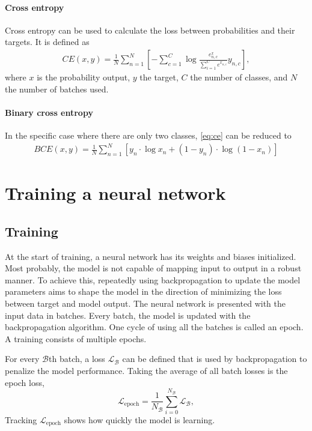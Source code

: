 \paragraph{Cross entropy}
Cross entropy can be used to calculate the loss between probabilities and their targets.
It is defined as
\begin{align}\label{eq:ce}
    CE(x, y) = \frac{1}{N}\sum_{n=1}^N \left[-\sum_{c=1}^C \log \frac{e^x_{n,c}}{\sum_{i=1}^C e^{x_{n,i}}} y_{n,c}\right],
\end{align}
where $x$ is the probability output, $y$ the target, $C$ the number of classes, and $N$ the number of batches used.

\paragraph{Binary cross entropy}
In the specific case where there are only two classes, \cref{eq:ce} can be reduced to
\begin{align}
    BCE(x, y) = \frac{1}{N}\sum_{n=1}^N [y_n \cdot \log x_n + (1 - y_n) \cdot \log (1-x_n)]
\end{align}


\section{Training a neural network}

\subsection{Training}\label{Training}
At the start of training, a neural network has its weights and biases initialized.
Most probably, the model is not capable of mapping input to output in a robust manner.
To achieve this, repeatedly using backpropagation to update the model parameters aims to shape the model in the direction of minimizing the loss between target and model output.
The neural network is presented with the input data in batches.
Every batch, the model is updated with the backpropagation algorithm.
One cycle of using all the batches is called an epoch.
A training consists of multiple epochs.

For every $\mathcal{B}$th batch, a loss $\mathcal{L}_\mathcal{B}$ can be defined that is used by backpropagation to penalize the model performance.
Taking the average of all batch losses is the epoch loss,
\begin{equation}
    \mathcal{L}_\mathrm{epoch} = \frac{1}{N_\mathcal{B}}\sum_{i=0}^{N_\mathcal{B}}\mathcal{L}_\mathcal{B},
\end{equation}
Tracking $\mathcal{L}_\mathrm{epoch}$ shows how quickly the model is learning.

